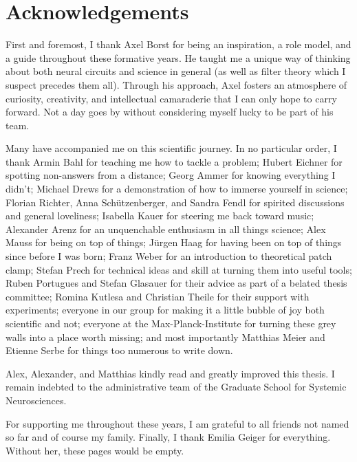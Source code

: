
\chapter*{Acknowledgements}
\label{chp:ack}

First and foremost, I thank Axel Borst for being an inspiration, a role model, and a guide throughout these formative years. He taught me a unique way of thinking about both neural circuits and science in general (as well as filter theory which I suspect precedes them all). Through his approach, Axel fosters an atmosphere of curiosity, creativity, and intellectual camaraderie that I can only hope to carry forward. Not a day goes by without considering myself lucky to be part of his team.

Many have accompanied me on this scientific journey. In no particular order, I thank
Armin Bahl for teaching me how to tackle a problem;
Hubert Eichner for spotting non-answers from a distance;
Georg Ammer for knowing everything I didn't;
Michael Drews for a demonstration of how to immerse yourself in science;
Florian Richter, Anna Schützenberger, and Sandra Fendl for spirited discussions and general loveliness;
Isabella Kauer for steering me back toward music;
Alexander Arenz for an unquenchable enthusiasm in all things science;
Alex Mauss for being on top of things;
Jürgen Haag for having been on top of things since before I was born;
Franz Weber for an introduction to theoretical patch clamp;
Stefan Prech for technical ideas and skill at turning them into useful tools;
Ruben Portugues and Stefan Glasauer for their advice as part of a belated thesis committee;
Romina Kutlesa and Christian Theile for their support with experiments;
everyone in our group for making it a little bubble of joy both scientific and not;
everyone at the Max-Planck-Institute for turning these grey walls into a place worth missing;
and most importantly Matthias Meier and Etienne Serbe for things too numerous to write down.

Alex, Alexander, and Matthias kindly read and greatly improved this thesis. I remain indebted to the administrative team of the Graduate School for Systemic Neurosciences.

For supporting me throughout these years, I am grateful to all friends not named so far and of course my family. Finally, I thank Emilia Geiger for everything. Without her, these pages would be empty.